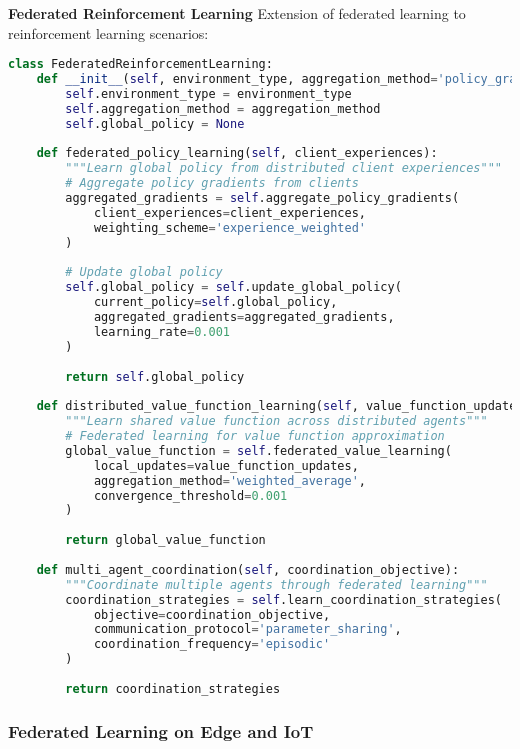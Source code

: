 \textbf{Federated Reinforcement Learning}
Extension of federated learning to reinforcement learning scenarios:

\begin{lstlisting}[language=python, caption=Federated Reinforcement Learning]
class FederatedReinforcementLearning:
    def __init__(self, environment_type, aggregation_method='policy_gradient'):
        self.environment_type = environment_type
        self.aggregation_method = aggregation_method
        self.global_policy = None
        
    def federated_policy_learning(self, client_experiences):
        """Learn global policy from distributed client experiences"""
        # Aggregate policy gradients from clients
        aggregated_gradients = self.aggregate_policy_gradients(
            client_experiences=client_experiences,
            weighting_scheme='experience_weighted'
        )
        
        # Update global policy
        self.global_policy = self.update_global_policy(
            current_policy=self.global_policy,
            aggregated_gradients=aggregated_gradients,
            learning_rate=0.001
        )
        
        return self.global_policy
        
    def distributed_value_function_learning(self, value_function_updates):
        """Learn shared value function across distributed agents"""
        # Federated learning for value function approximation
        global_value_function = self.federated_value_learning(
            local_updates=value_function_updates,
            aggregation_method='weighted_average',
            convergence_threshold=0.001
        )
        
        return global_value_function
        
    def multi_agent_coordination(self, coordination_objective):
        """Coordinate multiple agents through federated learning"""
        coordination_strategies = self.learn_coordination_strategies(
            objective=coordination_objective,
            communication_protocol='parameter_sharing',
            coordination_frequency='episodic'
        )
        
        return coordination_strategies
\end{lstlisting}

\subsubsection{Federated Learning on Edge and IoT}

